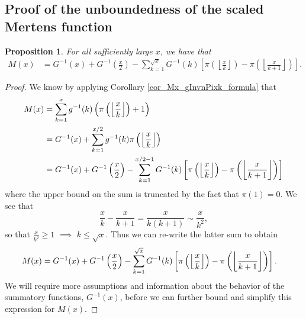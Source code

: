 \documentclass[11pt,reqno,a4letter]{article}
\numberwithin{figure}{section}
\numberwithin{table}{section}
\newcommand{\Floor}[2]{\ensuremath{\left\lfloor \frac{#1}{#2} \right\rfloor}}
\theoremstyle{plain}
\newtheorem{prop}[theorem]{Proposition}
\numberwithin{theorem}{section}
\theoremstyle{definition}
\begin{document}
\subsection{Proof of the unboundedness of the scaled Mertens function}
\label{subSection_TheCoreResultProof} 

\begin{prop} 
\label{prop_Mx_SBP_IntegralFormula} 
For all sufficiently large $x$, we have that 
\begin{align} 
\label{eqn_pf_tag_v2-restated_v2} 
M(x) & = G^{-1}(x) + G^{-1}\left(\frac{x}{2}\right) - 
     \sum_{k=1}^{\sqrt{x}} G^{-1}(k) \left[ 
     \pi\left(\Floor{x}{k}\right) - \pi\left(\Floor{x}{k+1}\right) 
     \right]. 
\end{align} 
\end{prop} 
\begin{proof} 
We know by applying Corollary \ref{cor_Mx_gInvnPixk_formula} that 
\begin{align} 
\notag
M(x) & = \sum_{k=1}^{x} g^{-1}(k) \left(\pi\left(\Floor{x}{k}\right)+1\right) \\ 
\label{eqn_proof_tag_MxFormulaInitSepTerms_v1} 
     & = G^{-1}(x) + \sum_{k=1}^{x/2} g^{-1}(k) \pi\left(\Floor{x}{k}\right) \\ 
     & = G^{-1}(x) + G^{-1}\left(\frac{x}{2}\right) - 
     \sum_{k=1}^{x/2-1} G^{-1}(k) \left[ 
     \pi\left(\Floor{x}{k}\right) - \pi\left(\Floor{x}{k+1}\right) 
     \right] 
\end{align} 
where the upper bound on the sum is truncated by the fact that $\pi(1) = 0$. 
We see that 
\[
\frac{x}{k} - \frac{x}{k+1} = \frac{x}{k(k+1)} \sim \frac{x}{k^2}, 
\]
so that $\frac{x}{k^2} \geq 1$ $\implies$ $k \leq \sqrt{x}$. 
Thus we can re-write the latter sum to obtain 
\begin{align*} 
\notag
M(x) & = G^{-1}(x) + G^{-1}\left(\frac{x}{2}\right) - 
     \sum_{k=1}^{\sqrt{x}} G^{-1}(k) \left[ 
     \pi\left(\Floor{x}{k}\right) - \pi\left(\Floor{x}{k+1}\right) 
     \right].
\end{align*} 
We will require more assumptions and information about the behavior 
of the summatory functions, $G^{-1}(x)$, before we can further bound and 
simplify this expression for $M(x)$. 
\end{proof} 
\end{document}

